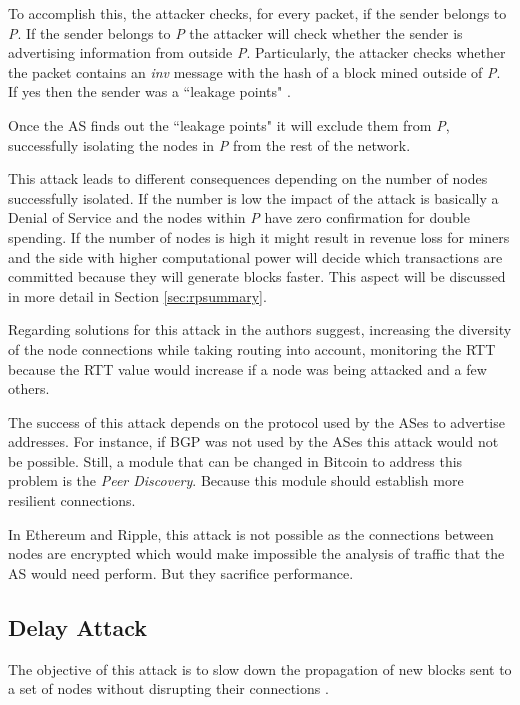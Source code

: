 To accomplish this, the attacker checks, for every packet, if the sender belongs to \textit{P}. If the sender belongs to \textit{P} the attacker will check whether the sender is advertising information from outside \textit{P}. Particularly, the attacker checks whether the packet contains an \textit{inv} message with the hash of a block mined outside of \textit{P}. If yes then the sender was a ``leakage points"  \cite{apostolaki2016hijacking}.

Once the AS finds out the ``leakage points" it will exclude them from \textit{P}, successfully isolating the nodes in \textit{P} from the rest of the network.

This attack leads to different consequences depending on the number of nodes successfully isolated. If the number is low the impact of the attack is basically a Denial of Service and the nodes within \textit{P} have zero confirmation for double spending. If the number of nodes is high it might result in revenue loss for miners and the side with higher computational power will decide which transactions are committed because they will generate blocks faster. This aspect will be discussed in more detail in Section \ref{sec:rpsummary}.

Regarding solutions for this attack in \cite{apostolaki2016hijacking} the authors suggest, increasing the diversity of the node connections while taking routing into account, monitoring the RTT because the RTT value would increase if a node was being attacked and a few others.

The success of this attack depends on the protocol used by the ASes to advertise addresses. For instance, if BGP was not used by the ASes this attack would not be possible. Still, a module that can be changed in Bitcoin to address this problem is the \textit{Peer Discovery}. Because this module should establish more resilient connections.

In Ethereum and Ripple, this attack is not possible as the connections between nodes are encrypted which would make impossible the analysis of traffic that the AS would need perform. But they sacrifice performance.

\subsection{Delay Attack}
The objective of this attack is to slow down the propagation of new blocks sent to a set of nodes without disrupting their connections \cite{apostolaki2016hijacking}.


